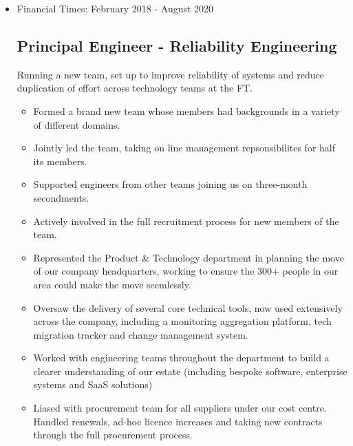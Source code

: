 \documentclass[a4paper]{article}
\newenvironment{detail}{\begin{adjustwidth}{10pt}{}}{\end{adjustwidth}}
\begin{document}
\begin{itemize}
\begin{detail}
\begin{itemize}
	\item Acted as tech lead and line manager for engineers in the cyber security team
	\item Managed security incidents across the business; collaborated with Operations team to improve process.
	\item Took responsibility for shaping the team's roadmap and seeing projects through to completion.
	\item Contributed to group-wide strategy, ensuring security was well represented.
	\item Worked on the democritisation of security data, to enable engineering teams to make better decisions around their own risks, beginning with an aggregated view of vulnerablity data.
	\item Advised on security related concerns across all the FT's engineering teams.
\end{itemize}
\end{detail}

\pagebreak

\item Financial Times: February 2018 - August 2020
\subsection*{Principal Engineer - Reliability Engineering}
\begin{detail}
Running a new team, set up to improve reliability of systems and reduce duplication of effort across technology teams at the FT.

\begin{itemize}
	\item Formed a brand new team whose members had backgrounds in a variety of different domains.
	\item Jointly led the team, taking on line management repsonsibilites for half its members.
	\item Supported engineers from other teams joining us on three-month secondments.
	\item Actively involved in the full recruitment process for new members of the team.
	\item Represented the Product \& Technology department in planning the move of our company headquarters, working to ensure the 300+ people in our area could make the move seemlessly.
	\item Oversaw the delivery of several core technical tools, now used extensively across the company, including a monitoring aggregation platform, tech migration tracker and change management system.
	\item Worked with engineering teams throughout the department to build a clearer understanding of our estate (including bespoke software, enterprise systems and SaaS solutions)
	\item Liased with procurement team for all suppliers under our cost centre.  Handled renewals, ad-hoc licence increases and taking new contracts through the full procurement process.
\end{itemize}
\end{detail}



\end{itemize}
\end{document}
